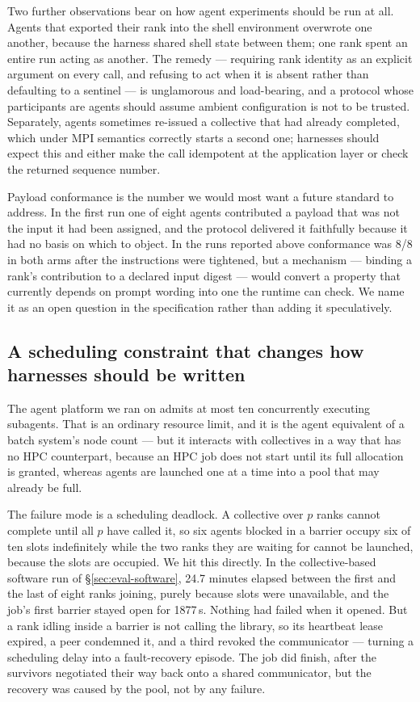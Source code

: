 Two further observations bear on how agent experiments should be run at all.
Agents that exported their rank into the shell environment overwrote one
another, because the harness shared shell state between them; one rank spent an
entire run acting as another.  The remedy --- requiring rank identity as an
explicit argument on every call, and refusing to act when it is absent rather
than defaulting to a sentinel --- is unglamorous and load-bearing, and a
protocol whose participants are agents should assume ambient configuration is
not to be trusted.  Separately, agents sometimes re-issued a collective that
had already completed, which under MPI semantics correctly starts a second
one; harnesses should expect this and either make the call idempotent at the
application layer or check the returned sequence number.

Payload conformance is the number we would most want a future standard to
address.  In the first run one of eight agents contributed a payload that was
not the input it had been assigned, and the protocol delivered it faithfully
because it had no basis on which to object.  In the runs reported above
conformance was 8/8 in both arms after the instructions were tightened, but a
mechanism --- binding a rank's contribution to a declared input digest --- would
convert a property that currently depends on prompt wording into one the
runtime can check.  We name it as an open question in the specification rather
than adding it speculatively.

\subsection{A scheduling constraint that changes how harnesses should be written}
\label{sec:eval-scheduling}

The agent platform we ran on admits at most ten concurrently executing
subagents.  That is an ordinary resource limit, and it is the agent equivalent
of a batch system's node count --- but it interacts with collectives in a way
that has no HPC counterpart, because an HPC job does not start until its full
allocation is granted, whereas agents are launched one at a time into a pool
that may already be full.

The failure mode is a scheduling deadlock.  A collective over $p$ ranks cannot
complete until all $p$ have called it, so six agents blocked in a barrier
occupy six of ten slots indefinitely while the two ranks they are waiting for
cannot be launched, because the slots are occupied.  We hit this directly.  In the collective-based software run of
\S\ref{sec:eval-software}, 24.7 minutes elapsed between the first and the last
of eight ranks joining, purely because slots were unavailable, and the job's
first barrier stayed open for 1877\,s.  Nothing had failed when it opened.  But
a rank idling inside a barrier is not calling the library, so its heartbeat
lease expired, a peer condemned it, and a third revoked the communicator ---
turning a scheduling delay into a fault-recovery episode.  The job did finish,
after the survivors negotiated their way back onto a shared communicator, but
the recovery was caused by the pool, not by any failure.

